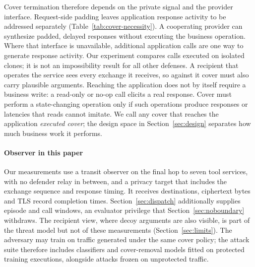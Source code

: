 Cover termination therefore depends on the private signal and the provider interface. Request-side padding leaves application response activity to be addressed separately (Table~\ref{tab:cover-necessity}). A cooperating provider can synthesize padded, delayed responses without executing the business operation. Where that interface is unavailable, additional application calls are one way to generate response activity. Our experiment compares calls executed on isolated clones; it is not an impossibility result for all other defenses. A recipient that operates the service sees every exchange it receives, so against it cover must also carry plausible arguments. Reaching the application does not by itself require a business write: a read-only or no-op call elicits a real response. Cover must perform a state-changing operation only if such operations produce responses or latencies that reads cannot imitate. We call any cover that reaches the application \emph{executed cover}; the design space in Section~\ref{sec:design} separates how much business work it performs.



\paragraph{Observer in this paper}
Our measurements use a transit observer on the final hop to seven tool services, with no defender relay in between, and a privacy target that includes the exchange sequence and response timing. It receives destinations, ciphertext bytes and TLS record completion times. Section~\ref{sec:dispatch} additionally supplies episode and call windows, an evaluator privilege that Section~\ref{sec:noboundary} withdraws. The recipient view, where decoy arguments are also visible, is part of the threat model but not of these measurements (Section~\ref{sec:limits}). The adversary may train on traffic generated under the same cover policy; the attack suite therefore includes classifiers and cover-removal models fitted on protected training executions, alongside attacks frozen on unprotected traffic.
